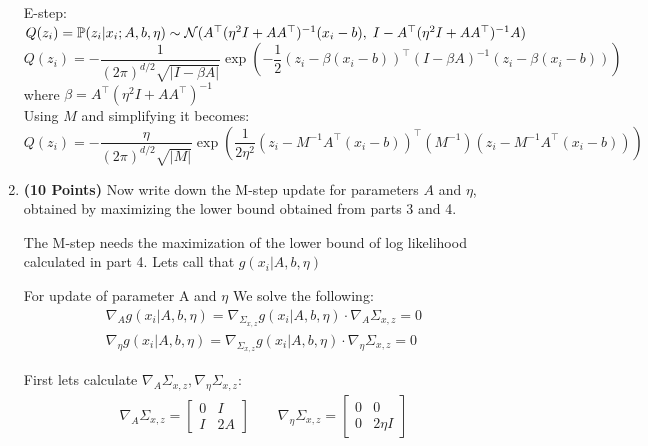\begin{enumerate}
\begin{soln}
    E-step: $Q(z_i) =  \mathbb{P}(z_i|x_i;A,b,\eta) \sim \mathcal{N}(A^\top(\eta^2I+AA^\top)^{-1}(x_i-b), \; I - A^\top(\eta^2I+AA^\top)^{-1}A) $
    $$
        Q(z_i) = -\frac{1}{{(2\pi)}^{d/2}\sqrt{|I-\beta A|}}\exp{\left(-\frac{1}{2}(z_i-\beta(x_i-b))^\top(I-\beta A)^{-1}(z_i-\beta(x_i-b))\right)}
    $$
    where $\beta = A^\top(\eta^2I+AA^\top)^{-1}$ \\
    
    Using $M$ and simplifying it becomes:
    $$
        Q(z_i) = -\frac{\eta}{{(2\pi)}^{d/2}\sqrt{|M|}}\exp\left({\frac{1}{2\eta^{2}}(z_i - M^{-1}A^\top(x_i-b))^\top(M^{-1})(z_i - M^{-1}A^\top(x_i-b))}\right)
    $$
\end{soln}

\item \textbf{(10 Points)}
Now write down the M-step update for parameters $A$ and $\eta$, obtained
by maximizing the lower bound obtained from parts 3 and 4.

\begin{soln}
    The M-step needs the maximization of the lower bound of log likelihood calculated in part 4. Lets call that $g(x_i|A,b,\eta)$

    For update of parameter A and $\eta$ We solve the following:
    \begin{gather*}
        \nabla_A g(x_i|A,b,\eta) = \nabla_{\Sigma_{x,z}} g(x_i|A,b,\eta)\cdot\nabla_A\Sigma_{x,z} = 0 \\
        \nabla_\eta g(x_i|A,b,\eta) = \nabla_{\Sigma_{x,z}} g(x_i|A,b,\eta)\cdot\nabla_\eta\Sigma_{x,z} = 0
    \end{gather*}
    
    First lets calculate $\nabla_A\Sigma_{x,z},\nabla_\eta\Sigma_{x,z}$:
    \begin{gather*}
        \nabla_A\Sigma_{x,z} = \left[ \begin{array}{cc} 0 & I \\ I & 2A \end{array} \right] \qquad \nabla_\eta\Sigma_{x,z} = \left[ \begin{array}{cc} 0 & 0 \\ 0 & 2\eta I \end{array} \right]
    \end{gather*}
    

\end{soln}
\end{enumerate}
